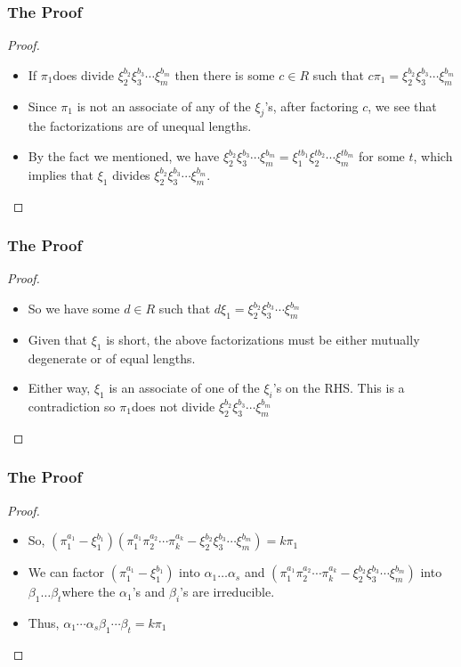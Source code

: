 \begin{frame}
  \frametitle{The Proof}
  \begin{proof}
    \begin{itemize}
      \item<1-> If $\pi_{1}$does divide $\xi_{2}^{b_{2}}\xi_{3}^{b_{3}}\cdots\xi_{m}^{b_{m}}$ then there is some $c\in R$ such that $c\pi_{1}=\xi_{2}^{b_{2}}\xi_{3}^{b_{3}}\cdots\xi_{m}^{b_{m}}$
      \item<2-> Since $\pi_1$ is not an associate of any of the $\xi_j$'s, after factoring $c$, we see that the factorizations are of unequal lengths.
      \item<3-> By the fact we mentioned, we have $\xi_{2}^{b_{2}}\xi_{3}^{b_{3}}\cdots\xi_{m}^{b_{m}}=\xi_{1}^{tb_{1}}\xi_{2}^{tb_{2}}\cdots\xi_{m}^{tb_{m}}$ for some $t$, which implies that $\xi_{1}$ divides $\xi_{2}^{b_{2}}\xi_{3}^{b_{3}}\cdots\xi_{m}^{b_{m}}$.
    \end{itemize}
    \noqedsymbol
  \end{proof}
\end{frame}

\begin{frame}
  \frametitle{The Proof}
  \begin{proof}
    \begin{itemize}
      \item<1-> So we have some $d\in R$ such that $d\xi_{1}=\xi_{2}^{b_{2}}\xi_{3}^{b_{3}}\cdots\xi_{m}^{b_{m}}$
      \item<2-> Given that $\xi_{1}$ is short, the above factorizations must be either mutually degenerate or of equal lengths.
      \item<3-> Either way, $\xi_{1}$ is an associate of one of the $\xi_{i}$'s on the RHS. This is a contradiction so $\pi_{1}$does not divide $\xi_{2}^{b_{2}}\xi_{3}^{b_{3}}\cdots\xi_{m}^{b_{m}}$
    \end{itemize}
    \noqedsymbol
  \end{proof}
\end{frame}

\begin{frame}
  \frametitle{The Proof}
  \begin{proof}
    \begin{itemize}
      \item<1-> So, $(\pi_{1}^{a_{1}}-\xi_{1}^{b_{1}})(\pi_{1}^{a_{1}}\pi_{2}^{a_{2}}\cdots\pi_{k}^{a_{k}}-\xi_{2}^{b_{2}}\xi_{3}^{b_{3}}\cdots\xi_{m}^{b_{m}})=k\pi_{1}$
      \item<2-> We can factor $(\pi_{1}^{a_{1}}-\xi_{1}^{b_{1}})$ into $\alpha_{1}\ldots\alpha_{s}$ and $(\pi_{1}^{a_{1}}\pi_{2}^{a_{2}}\cdots\pi_{k}^{a_{k}}-\xi_{2}^{b_{2}}\xi_{3}^{b_{3}}\cdots\xi_{m}^{b_{m}})$ into $\beta_{1}\ldots\beta_{t}$where the $\alpha_{1}$'s and $\beta_{i}$'s are irreducible. 
      \item<3-> Thus, $\alpha_{1}\cdots\alpha_{s}$$\beta_{1}\cdots\beta_{t}=k\pi_{1}$ 
    \end{itemize}
    \noqedsymbol
  \end{proof}
\end{frame}


